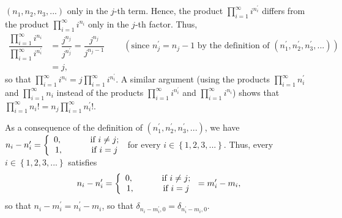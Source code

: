 \documentclass[etingof-lie.tex]{subfiles}
\begin{document}
$\left(  n_{1},n_{2},n_{3},...\right)  $ only in the $j$-th term. Hence, the
product $\prod\limits_{i=1}^{\infty}i^{n_{i}^{\prime}}$ differs from the
product $\prod\limits_{i=1}^{\infty}i^{n_{i}}$ only in the $j$-th factor.
Thus,%
\begin{align*}
\dfrac{\prod\limits_{i=1}^{\infty}i^{n_{i}}}{\prod\limits_{i=1}^{\infty
}i^{n_{i}^{\prime}}}  &  =\dfrac{j^{n_{j}}}{j^{n_{j}^{\prime}}}=\dfrac
{j^{n_{j}}}{j^{n_{j}-1}}\ \ \ \ \ \ \ \ \ \ \left(  \text{since }n_{j}%
^{\prime}=n_{j}-1\text{ by the definition of }\left(  n_{1}^{\prime}%
,n_{2}^{\prime},n_{3}^{\prime},...\right)  \right) \\
&  =j,
\end{align*}
so that $\prod\limits_{i=1}^{\infty}i^{n_{i}}=j\prod\limits_{i=1}^{\infty
}i^{n_{i}^{\prime}}$. A similar argument (using the products $\prod
\limits_{i=1}^{\infty}n_{i}^{\prime}$ and $\prod\limits_{i=1}^{\infty}n_{i}$
instead of the products $\prod\limits_{i=1}^{\infty}i^{n_{i}^{\prime}}$ and
$\prod\limits_{i=1}^{\infty}i^{n_{i}}$) shows that $\prod\limits_{i=1}%
^{\infty}n_{i}!=n_{j}\prod\limits_{i=1}^{\infty}n_{i}^{\prime}!$.

As a consequence of the definition of $\left(  n_{1}^{\prime},n_{2}^{\prime
},n_{3}^{\prime},...\right)  $, we have $n_{i}-n_{i}^{\prime}=\left\{
\begin{array}
[c]{c}%
0,\ \ \ \ \ \ \ \ \ \ \text{if }i\neq j;\\
1,\ \ \ \ \ \ \ \ \ \ \text{if }i=j
\end{array}
\right.  $ for every $i\in\left\{  1,2,3,...\right\}  $. Thus, every
$i\in\left\{  1,2,3,...\right\}  $ satisfies%
\[
n_{i}-n_{i}^{\prime}=\left\{
\begin{array}
[c]{c}%
0,\ \ \ \ \ \ \ \ \ \ \text{if }i\neq j;\\
1,\ \ \ \ \ \ \ \ \ \ \text{if }i=j
\end{array}
\right.  =m_{i}^{\prime}-m_{i},
\]
so that $n_{i}-m_{i}^{\prime}=n_{i}^{\prime}-m_{i}$, so that $\delta
_{n_{i}-m_{i}^{\prime},0}=\delta_{n_{i}^{\prime}-m_{i},0}$.
\end{document}

